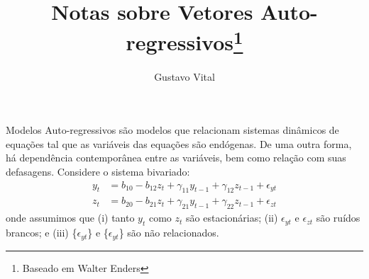 \documentclass[11pt,a4paper]{article}
\author{Gustavo Vital}
\title{Notas sobre Vetores Auto-regressivos\footnote{Baseado em Walter Enders}}
\begin{document}
\maketitle

Modelos Auto-regressivos são modelos que relacionam sistemas dinâmicos de equações tal que as variáveis das equações são endógenas. De uma outra forma, há dependência contemporânea entre as variáveis, bem como relação com suas defasagens. Considere o sistema bivariado: 
\begin{align} \label{eq1}
y_t &= b_{10} - b_{12}z_t + \gamma_{11}y_{t-1} + \gamma_{12}z_{t-1} + \epsilon_{yt}\\ \label{eq2}
z_t &= b_{20} - b_{21}z_t + \gamma_{21}y_{t-1} + \gamma_{22}z_{t-1} + \epsilon_{zt} 
\end{align}
\noindent
onde assumimos que (i) tanto $y_t$ como $z_t$ são estacionárias; (ii) $\epsilon_{yt}$ e $\epsilon_{zt}$ são ruídos brancos; e (iii) \{$\epsilon_{yt}$\} e \{$\epsilon_{yt}$\} são não relacionados.
\end{document}
